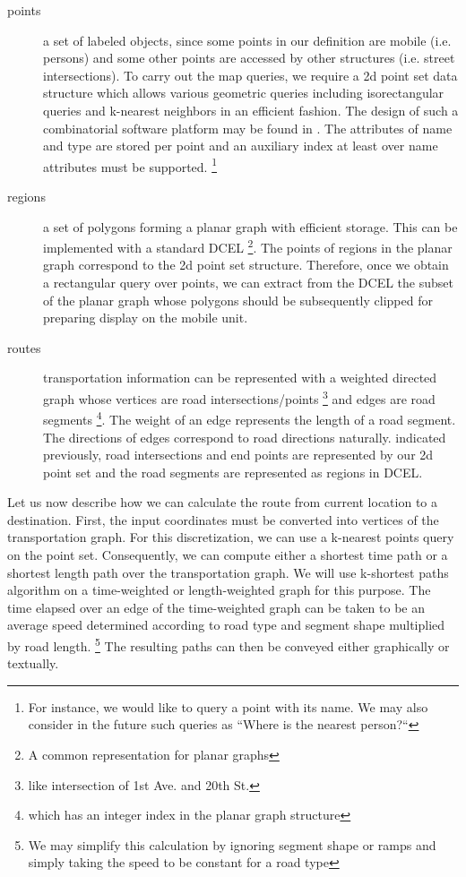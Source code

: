 \documentclass[a4paper,10pt]{article}
\begin{document}
\begin{description}
\item[points] a set of labeled objects, since some points in our definition
  are mobile (i.e. persons) and some other points are accessed by other
  structures (i.e. street intersections). To carry out the map queries, we
  require a 2d point set data structure which allows various geometric
  queries including isorectangular queries and k-nearest neighbors in an
  efficient fashion. The design of such a combinatorial software platform
  may be found in \cite{leda}. The attributes of name and type are stored
  per point and an auxiliary index at least over name attributes must be
  supported. \footnote{For instance, we would like to query a point with its
  name. We may also consider in the future such queries as ``Where is the
  nearest person?``}
\item[regions] a set of polygons forming a planar graph with efficient
  storage.  This can be implemented with a standard DCEL \footnote{A common
    representation for planar graphs}. The points of regions in the planar
  graph correspond to the 2d point set structure. Therefore, once we obtain
  a rectangular query over points, we can extract from the DCEL the subset
  of the planar graph whose polygons should be subsequently clipped for
  preparing display on the mobile unit.
\item[routes] transportation information can be represented with a weighted
  directed graph whose vertices are road intersections/points \footnote{like
    intersection of 1st Ave. and 20th St.} and edges are road segments
  \footnote{which has an integer index in the planar graph structure}.  The
  weight of an edge represents the length of a road segment. The directions
  of edges correspond to road directions naturally.  indicated previously,
  road intersections and end points are represented by our 2d point set and
  the road segments are represented as regions in DCEL.
\end{description}

Let us now describe how we can calculate the route from current location to
a destination. First, the input coordinates must be converted into vertices
of the transportation graph. For this discretization, we can use a k-nearest
points query on the point set. Consequently, we can compute either a
shortest time path or a shortest length path over the transportation graph.
We will use k-shortest paths algorithm on a time-weighted or length-weighted
graph for this purpose. The time elapsed over an edge of the time-weighted
graph can be taken to be an average speed determined according to road type
and segment shape multiplied by road length. \footnote{We may simplify this
  calculation by ignoring segment shape or ramps and simply taking the speed
  to be constant for a road type} The resulting paths can then be
conveyed either graphically or textually.
\end{document}
